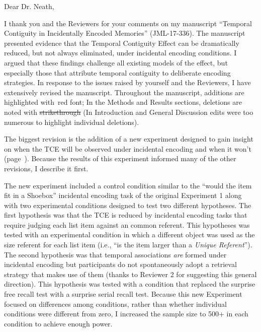 \documentclass[12pt]{article}
\begin{document}
Dear Dr. Neath,

I thank you and the Reviewers for your comments on my manuscript ``Temporal Contiguity in Incidentally Encoded Memories'' (JML-17-336). The manuscript presented evidence that the Temporal Contiguity Effect can be dramatically reduced, but not always eliminated, under incidental encoding conditions. I argued that these findings challenge all existing models of the effect, but especially those that attribute temporal contiguity to deliberate encoding strategies. In response to the issues raised by yourself and the Reviewers, I have extensively revised the manuscript. Throughout the manuscript, additions are highlighted with~\color{red}red font\color{black}; In the Methods and Results sections, deletions are noted with \st{strikethrough} (In Introduction and General Discussion edits were too numerous to highlight individual deletions).

The biggest revision is the addition of a new experiment designed to gain insight on when the TCE will be observed under incidental encoding and when it won't (page~\pageref{newexp}). Because the results of this experiment informed many of the other revisions, I describe it first.

The new experiment included a control condition similar to the ``would the item fit in a Shoebox'' incidental encoding task of the original Experiment 1 along with two experimental conditions designed to test two different hypotheses. The first hypothesis was that the TCE is reduced by incidental encoding tasks that require judging each list item against an common referent. This hypotheses was tested with an experimental condition in which a different object was used as the size referent for each list item (i.e., ``is the item larger than a \emph{Unique Referent}''). The second hypothesis was that temporal associations \emph{are} formed under incidental encoding but participants do not spontaneously adopt a retrieval strategy that makes use of them (thanks to Reviewer 2 for suggesting this general direction). This hypothesis was tested with a condition that replaced the surprise free recall test with a surprise serial recall test. Because this new Experiment focused on differences among conditions, rather than whether individual conditions were different from zero, I increased the sample size to 500+ in each condition to achieve enough power.
\end{document}
